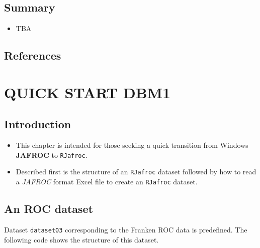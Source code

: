 \documentclass[
]{book}
\providecommand{\tightlist}{%
  \setlength{\itemsep}{0pt}\setlength{\parskip}{0pt}}
\begin{document}
\hypertarget{summary-2}{%
\section{Summary}\label{summary-2}}

\begin{itemize}
\tightlist
\item
  TBA
\end{itemize}

\hypertarget{references-3}{%
\section{References}\label{references-3}}

\hypertarget{QuickStartDBM1}{%
\chapter{QUICK START DBM1}\label{QuickStartDBM1}}

\hypertarget{introduction-5}{%
\section{Introduction}\label{introduction-5}}

\begin{itemize}
\tightlist
\item
  This chapter is intended for those seeking a quick transition from Windows \textbf{JAFROC} to \texttt{RJafroc}.
\item
  Described first is the structure of an \texttt{RJafroc} dataset followed by how to read
  a \emph{JAFROC} format Excel file to create an \texttt{RJafroc} dataset.
\end{itemize}

\hypertarget{an-roc-dataset}{%
\section{An ROC dataset}\label{an-roc-dataset}}

Dataset \texttt{dataset03} corresponding to the Franken ROC data \citep{RN1995} is predefined. The following code shows the structure of this dataset.
\end{document}
